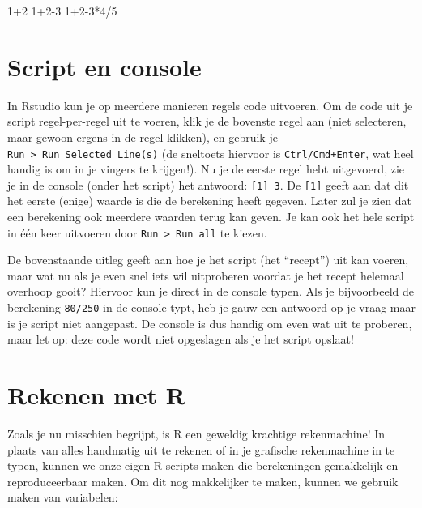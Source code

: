 \documentclass[
  b5paper,
  DIV=11,
  numbers=noendperiod]{scrreprt}
\newenvironment{Shaded}{\begin{snugshade}}{\end{snugshade}}
\newcommand{\DecValTok}[1]{\textcolor[rgb]{0.68,0.00,0.00}{#1}}
\newcommand{\SpecialCharTok}[1]{\textcolor[rgb]{0.37,0.37,0.37}{#1}}
\theoremstyle{definition}
\theoremstyle{remark}
\begin{document}
\begin{Shaded}
\begin{Highlighting}[]
\DecValTok{1}\SpecialCharTok{+}\DecValTok{2}
\DecValTok{1}\SpecialCharTok{+}\DecValTok{2{-}3}
\DecValTok{1}\SpecialCharTok{+}\DecValTok{2{-}3}\SpecialCharTok{*}\DecValTok{4}\SpecialCharTok{/}\DecValTok{5}
\end{Highlighting}
\end{Shaded}

\section{Script en console}\label{script-en-console}

In Rstudio kun je op meerdere manieren regels code uitvoeren. Om de code
uit je script regel-per-regel uit te voeren, klik je de bovenste regel
aan (niet selecteren, maar gewoon ergens in de regel klikken), en
gebruik je \texttt{Run\ \textgreater{}\ Run\ Selected\ Line(s)} (de
sneltoets hiervoor is \texttt{Ctrl/Cmd+Enter}, wat heel handig is om in
je vingers te krijgen!). Nu je de eerste regel hebt uitgevoerd, zie je
in de console (onder het script) het antwoord: \texttt{{[}1{]}\ 3}. De
\texttt{{[}1{]}} geeft aan dat dit het eerste (enige) waarde is die de
berekening heeft gegeven. Later zul je zien dat een berekening ook
meerdere waarden terug kan geven. Je kan ook het hele script in één keer
uitvoeren door \texttt{Run\ \textgreater{}\ Run\ all} te kiezen.

De bovenstaande uitleg geeft aan hoe je het script (het ``recept'') uit
kan voeren, maar wat nu als je even snel iets wil uitproberen voordat je
het recept helemaal overhoop gooit? Hiervoor kun je direct in de console
typen. Als je bijvoorbeeld de berekening \texttt{80/250} in de console
typt, heb je gauw een antwoord op je vraag maar is je script niet
aangepast. De console is dus handig om even wat uit te proberen, maar
let op: deze code wordt niet opgeslagen als je het script opslaat!

\section{Rekenen met R}\label{rekenen-met-r}

Zoals je nu misschien begrijpt, is R een geweldig krachtige
rekenmachine! In plaats van alles handmatig uit te rekenen of in je
grafische rekenmachine in te typen, kunnen we onze eigen R-scripts maken
die berekeningen gemakkelijk en reproduceerbaar maken. Om dit nog
makkelijker te maken, kunnen we gebruik maken van variabelen:
\end{document}
